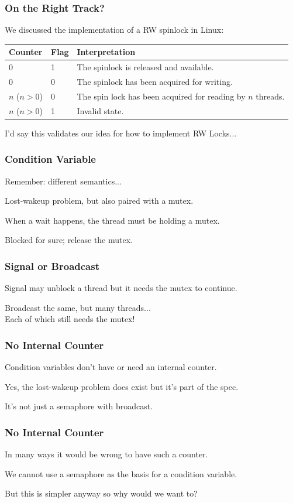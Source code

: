 \begin{frame}
\frametitle{On the Right Track?}

 We discussed the implementation of a RW spinlock in Linux:

\begin{center}
	\begin{tabular}{l|l|l}
		\textbf{Counter} & \textbf{Flag} & \textbf{Interpretation}                                     \\\hline
		0                & 1             & The spinlock is released and available.                     \\
		0                & 0             & The spinlock has been acquired for writing.                 \\
		$n$ ($n > 0$)    & 0             & The spin lock has been acquired for reading by $n$ threads. \\
		$n$ ($n > 0$)    & 1             & Invalid state.                                              \\
	\end{tabular}
\end{center}

I'd say this validates our idea for how to implement RW Locks...

\end{frame}

\begin{frame}
\frametitle{Condition Variable}

Remember: different semantics...

Lost-wakeup problem, but also paired with a mutex.

When a wait happens, the thread must be holding a mutex.

Blocked for sure; release the mutex.

\end{frame}

\begin{frame}
\frametitle{Signal or Broadcast}

Signal may unblock a thread but it needs the mutex to continue.

Broadcast the same, but many threads...\\
\quad Each of which still needs the mutex!

\end{frame}

\begin{frame}
\frametitle{No Internal Counter}

Condition variables don't have or need an internal counter.

Yes, the lost-wakeup problem does exist but it's part of the spec.

It's not just a semaphore with broadcast.

\end{frame}

\begin{frame}
\frametitle{No Internal Counter}

In many ways it would be wrong to have such a counter.

We cannot use a semaphore as the basis for a condition variable.

But this is simpler anyway so why would we want to?

\end{frame}



